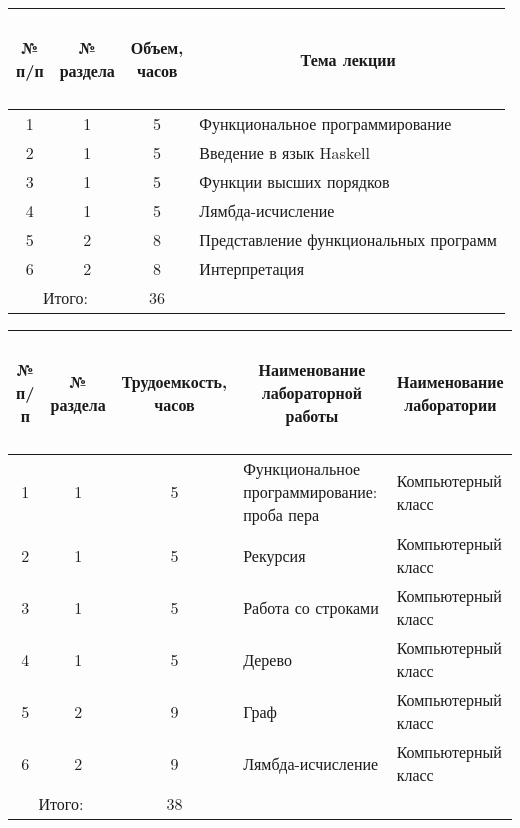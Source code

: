 
\begin{center}
\begin{longtable}{|c|c|c|p{}|}\hline
\multicolumn{1}{|c|}{\parbox{1cm}{\bfseries~\\№\\п/п\\~}} &
\multicolumn{1}{c|}{\parbox{2cm}{\bfseries №\\раздела}} &
\multicolumn{1}{c|}{\parbox{3cm}{\bfseries Объем,\\часов}} &
\multicolumn{1}{c|}{\bfseries Тема лекции} \\\hline
1 & 1 & 5 & Функциональное программирование\\\hline
2 & 1 & 5 & Введение в язык Haskell\\\hline
3 & 1 & 5 & Функции высших порядков\\\hline
4 & 1 & 5 & Лямбда-исчисление\\\hline
5 & 2 & 8 & Представление функциональных программ\\\hline
6 & 2 & 8 & Интерпретация\\\hline

\multicolumn{2}{|c|}{Итого:} & 36 & \\\hline
\end{longtable}
\end{center}



\begin{center}
\begin{longtable}{|c|c|c|p{}|p{}|}\hline
\multicolumn{1}{|c|}{\parbox[c]{0.6cm}{\bfseries~\\№\\п/п\\~}} &
\multicolumn{1}{c|}{\parbox[c]{1.7cm}{\bfseries №\\раздела}} &
\multicolumn{1}{c|}{\parbox[c]{3cm}{\bfseries Трудоемкость,\\часов}} &
\multicolumn{1}{c|}{\parbox[c]{3.5cm}{\bfseries Наименование лабораторной\\работы}} &
\multicolumn{1}{c|}{\parbox[c]{3.5cm}{\bfseries Наименование\\лаборатории}} \\\hline
1 & 1 & 5 & Функциональное программирование: проба пера & Компьютерный класс\\\hline
2 & 1 & 5 & Рекурсия & Компьютерный класс\\\hline
3 & 1 & 5 & Работа со строками & Компьютерный класс\\\hline
4 & 1 & 5 & Дерево & Компьютерный класс\\\hline
5 & 2 & 9 & Граф & Компьютерный класс\\\hline
6 & 2 & 9 & Лямбда-исчисление & Компьютерный класс\\\hline

\multicolumn{2}{|c|}{Итого:} & 38 & & \\\hline
\end{longtable}
\end{center}


